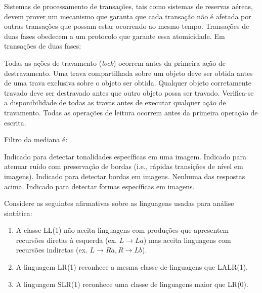 \documentclass[12pt, addpoints]{exam}
\begin{document}
\begin{questions}
\question

Sistemas de processamento de transações, tais como sistemas de reservas aéreas, devem prover um mecanismo que garanta que cada transação não é afetada por outras transações que possam estar ocorrendo ao mesmo tempo. Transações de duas fases obedecem a um protocolo que garante essa atomicidade. Em transações de duas fases:


\begin{choices}
\choice Todas as ações de travamento (\textit{lock}) ocorrem antes da primeira ação de destravamento.
\choice Uma trava compartilhada sobre um objeto deve ser obtida antes de uma trava exclusiva sobre o objeto ser obtida.
\choice Qualquer objeto corretamente travado deve ser destravado antes que outro objeto possa ser travado.
\choice Verifica-se a disponibilidade de todas as travas antes de executar qualquer ação de travamento.
\choice Todas as operações de leitura ocorrem antes da primeira operação de escrita.
\end{choices}

\question

Filtro da mediana é:
\begin{choices}
\choice Indicado para detectar tonalidades específicas em uma imagem.
\choice Indicado para atenuar ruído com preservação de bordas (i.e., rápidas transições de nível em imagens).
\choice Indicado para detectar bordas em imagens.
\choice Nenhuma das respostas acima.
\choice Indicado para detectar formas específicas em imagens.
\end{choices}

\question

Considere as seguintes afirmativas sobre as linguagens usadas para análise sintática:

\begin{enumerate}[label=\Roman*.]

    \item A classe LL(1) não aceita linguagens com produções que apresentem recursões diretas à esquerda (ex. \(L \rightarrow La\)) mas aceita linguagens com recursões indiretas (ex. \(L \rightarrow Ra, R \rightarrow Lb\)).

    \item A linguagem LR(1) reconhece a mesma classe de linguagens que LALR(1).

    \item A linguagem SLR(1) reconhece uma classe de linguagens maior que LR(0).

\end{enumerate}


\end{questions}
\end{document}
